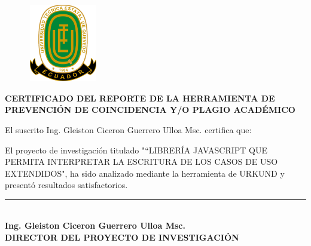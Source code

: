\begin{center}
	
		\begin{figure}[htb]
		\begin{center}
			\includegraphics[width=3.04cm,height=3.39cm]{img/logoUTEQ.png}
		\end{center}
	\end{figure}
	
	
	{\titulodc \textbf{CERTIFICADO DEL REPORTE DE LA HERRAMIENTA DE PREVENCIÓN DE COINCIDENCIA Y/O PLAGIO ACADÉMICO}}
\end{center}

El suscrito Ing. Gleiston Ciceron Guerrero Ulloa Msc. certifica que:

El proyecto de investigación titulado "“LIBRERÍA JAVASCRIPT QUE PERMITA
INTERPRETAR LA ESCRITURA DE LOS CASOS DE USO EXTENDIDOS", ha sido analizado mediante la herramienta de URKUND y presentó resultados satisfactorios.

\begin{center}
	
\end{center}

\begin{center}
	\vspace*{3in}
	\rule{8cm}{0.1mm} \\
	\textbf{Ing. Gleiston Ciceron Guerrero Ulloa Msc. \\
		DIRECTOR DEL PROYECTO DE INVESTIGACIÓN}
\end{center}
